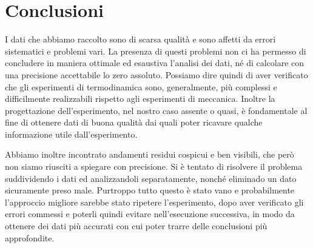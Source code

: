 \section{Conclusioni}

I dati che abbiamo raccolto sono di scarsa qualità e sono affetti da errori sistematici e problemi vari.
La presenza di questi problemi non ci ha permesso di concludere in maniera ottimale ed esaustiva l'analisi dei dati, né di
calcolare con una precisione accettabile lo zero assoluto. Possiamo dire quindi di aver verificato che gli esperimenti di
termodinamica sono, generalmente, più complessi e difficilmente realizzabili rispetto agli esperimenti di meccanica.
Inoltre la progettazione dell'esperimento, nel nostro caso assente o quasi, è fondamentale al fine di ottenere dati di buona
qualità dai quali poter ricavare qualche informazione utile dall'esperimento.

Abbiamo inoltre incontrato andamenti residui cospicui e ben visibili, che però non siamo riusciti a spiegare con precisione.
Si è tentato di risolvere il problema suddividendo i dati ed analizzandoli separatamente, nonché eliminado un dato
sicuramente preso male. Purtroppo tutto questo è stato vano e probabilmente l'approccio migliore sarebbe stato ripetere
l'esperimento, dopo aver verificato gli errori commessi e poterli quindi evitare nell'esecuzione successiva, in modo da ottenere dei dati più accurati con cui poter trarre delle conclusioni più approfondite.

